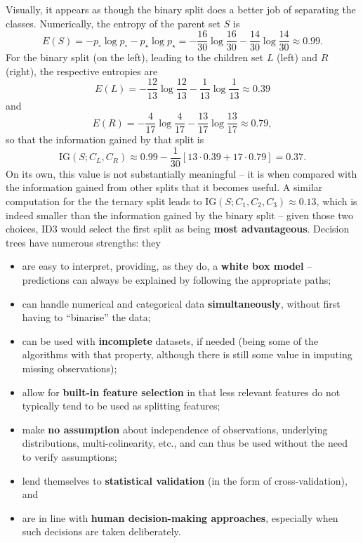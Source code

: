 \afterpage{\FloatBarrier}
Visually, it appears as though the binary split does a better job of separating the classes. Numerically, the entropy of the parent set $S$ is $$E(S)=-p_{\circ}\log p_{\circ} - p_{\star}\log p_{\star}=-\frac{16}{30}\log \frac{16}{30} - \frac{14}{30}\log \frac{14}{30} \approx 0.99.$$ For the binary split (on the left), leading to the children set $L$ (left) and $R$ (right), the respective entropies are 
$$E(L)=-\frac{12}{13}\log \frac{12}{13} - \frac{1}{13}\log \frac{1}{13} \approx 0.39 $$ and 
$$E(R)=-\frac{4}{17}\log \frac{4}{17} - \frac{13}{17}\log \frac{13}{17} \approx 0.79,$$
so that the information gained by that split is 
$$\textrm{IG}(S;C_L,C_R)\approx 0.99-\frac{1}{30}\left[13\cdot 0.39+17\cdot 0.79\right]=0.37.$$ On its own, this value is not substantially meaningful -- it is when compared with the information gained from other splits that it becomes useful. 
A similar computation for the the ternary split leads to $\textrm{IG}(S;C_1,C_2,C_3)\approx 0.13$, which is indeed smaller than the information gained by the binary split -- given those two choices, ID3 would select the first split as being \textbf{most advantageous}. \newpage\noindent
Decision trees have numerous strengths: they 
\begin{itemize}[noitemsep]
\item are easy to interpret, providing, as they do, a \textbf{white box model} -- predictions can always be explained by following the appropriate paths;
\item can handle numerical and categorical data \textbf{simultaneously}, without first having to ``binarise'' the data;
\item can be used with \textbf{incomplete} datasets, if needed (being some of the algorithms with that property, although there is still some value in imputing missing observations);
\item allow for \textbf{built-in feature selection} in that less relevant features do not typically tend to be used as splitting features; 
\item make \textbf{no assumption} about independence of observations, underlying distributions, multi-colinearity, etc., and can thus be used without the need to verify assumptions; 
\item lend themselves to \textbf{statistical validation} (in the form of cross-validation), and 
\item are in line with \textbf{human decision-making approaches}, especially when such decisions are taken deliberately.
\end{itemize}
